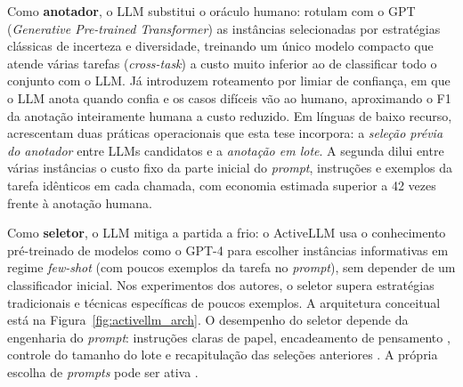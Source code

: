 Como \textbf{anotador}, o LLM substitui o oráculo humano: \citet{Zhang2025}
rotulam com o GPT (\textit{Generative Pre-trained Transformer}) as
instâncias selecionadas por estratégias clássicas de
incerteza e diversidade, treinando um único modelo compacto que atende várias
tarefas (\textit{cross-task}) a
custo muito inferior ao de classificar todo o conjunto com o LLM. Já
\citet{Rouzegar2024} introduzem roteamento por limiar de confiança, em que o
LLM anota quando confia e os casos difíceis vão ao humano, aproximando o F1 da
anotação inteiramente humana a custo reduzido. Em línguas de baixo recurso,
\citet{Kholodna2024} acrescentam duas práticas operacionais que esta tese
incorpora: a \emph{seleção prévia do anotador} entre LLMs candidatos e a
\emph{anotação em lote}. A segunda dilui entre várias instâncias o custo fixo
da parte inicial do \textit{prompt}, instruções e exemplos da tarefa
idênticos em cada chamada, com economia estimada superior a 42 vezes frente à
anotação humana.

Como \textbf{seletor}, o LLM mitiga a partida a frio: o ActiveLLM
\citep{Bayer2024ActiveLLM} usa o conhecimento pré-treinado de modelos como o GPT-4 para
escolher instâncias informativas em regime \textit{few-shot} (com poucos
exemplos da tarefa no \textit{prompt}), sem depender de
um classificador inicial. Nos experimentos dos autores, o seletor supera
estratégias tradicionais e técnicas específicas de poucos exemplos. A arquitetura conceitual está na
Figura~\ref{fig:activellm_arch}. O desempenho do seletor depende da engenharia
do \textit{prompt}: instruções claras de papel, encadeamento de pensamento
\citep{Wei2022}, controle do tamanho do lote e recapitulação das seleções
anteriores \citep{Bayer2024ActiveLLM}. A própria escolha de \textit{prompts}
pode ser ativa \citep{Diao2023}.

